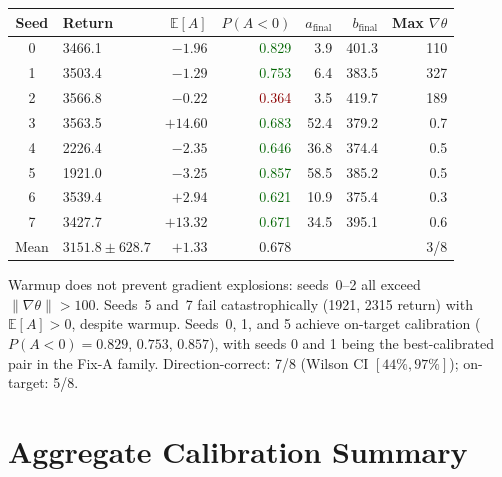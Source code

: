 \documentclass[10pt,a4paper]{article}
\begin{document}
\begin{center}
\setlength{\tabcolsep}{5pt}
\begin{tabular}{clrrrrr}
\toprule
\textbf{Seed} & \textbf{Return} & $\mathbb{E}[A]$ &
  $P(A{<}0)$ & $a_\text{final}$ & $b_\text{final}$ & Max $\nabla\theta$ \\
\midrule
0 & 3466.1 & $-1.96$ & \textcolor{darkgreen}{0.829} &  3.9 & 401.3 & 110 \\
1 & 3503.4 & $-1.29$ & \textcolor{darkgreen}{0.753} &  6.4 & 383.5 & 327 \\
2 & 3566.8 & $-0.22$ & \textcolor{darkred}{0.364} &  3.5 & 419.7 & 189 \\
3 & 3563.5 & $+14.60$ & \textcolor{darkgreen}{0.683} & 52.4 & 379.2 & 0.7 \\
4 & 2226.4 & $-2.35$ & \textcolor{darkgreen}{0.646} & 36.8 & 374.4 & 0.5 \\
5 & 1921.0 & $-3.25$ & \textcolor{darkgreen}{0.857} & 58.5 & 385.2 & 0.5 \\
6 & 3539.4 & $+2.94$ & \textcolor{darkgreen}{0.621} & 10.9 & 375.4 & 0.3 \\
7 & 3427.7 & $+13.32$ & \textcolor{darkgreen}{0.671} & 34.5 & 395.1 & 0.6 \\
\midrule
Mean & $3151.8 \pm 628.7$ & $+1.33$ & 0.678 &
  \multicolumn{2}{r}{} & 3/8 \\
\bottomrule
\end{tabular}
\end{center}

Warmup does not prevent gradient explosions: seeds~0--2 all exceed
$\|\nabla\theta\|>100$. Seeds~5 and~7 fail catastrophically (1921, 2315 return)
with $\mathbb{E}[A]>0$, despite warmup. Seeds~0, 1, and 5 achieve on-target
calibration ($P(A<0)=0.829$, $0.753$, $0.857$), with seeds 0 and 1 being the
best-calibrated pair in the Fix-A family. Direction-correct: 7/8 (Wilson CI
$[44\%,97\%]$); on-target: 5/8.

\section{Aggregate Calibration Summary}
\end{document}
